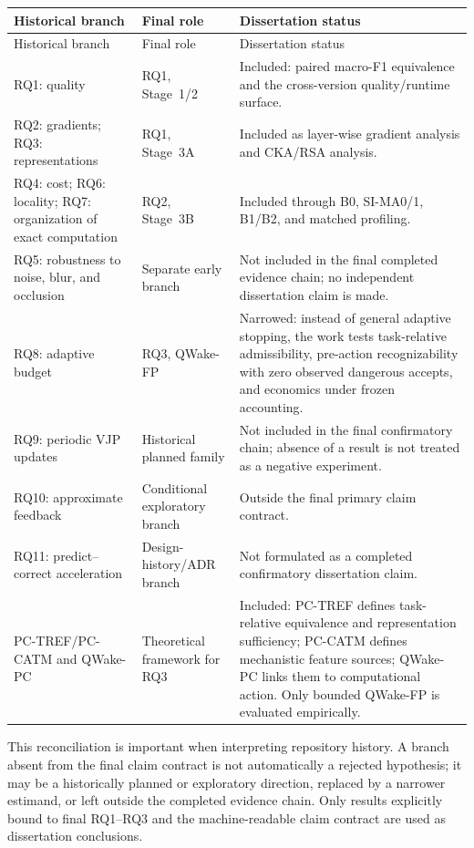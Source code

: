 \begin{longtable}{@{}L{0.19\textwidth}L{0.31\textwidth}L{0.39\textwidth}@{}}
\toprule
Historical branch & Final role & Dissertation status \\
\midrule
\endfirsthead
\toprule
Historical branch & Final role & Dissertation status \\
\midrule
\endhead
RQ1: quality & RQ1, Stage~1/2 & Included: paired macro-F1 equivalence and the cross-version quality/runtime surface. \\
RQ2: gradients; RQ3: representations & RQ1, Stage~3A & Included as layer-wise gradient analysis and CKA/RSA analysis. \\
RQ4: cost; RQ6: locality; RQ7: organization of exact computation & RQ2, Stage~3B & Included through B0, SI-MA0/1, B1/B2, and matched profiling. \\
RQ5: robustness to noise, blur, and occlusion & Separate early branch & Not included in the final completed evidence chain; no independent dissertation claim is made. \\
RQ8: adaptive budget & RQ3, QWake-FP & Narrowed: instead of general adaptive stopping, the work tests task-relative admissibility, pre-action recognizability with zero observed dangerous accepts, and economics under frozen accounting. \\
RQ9: periodic VJP updates & Historical planned family & Not included in the final confirmatory chain; absence of a result is not treated as a negative experiment. \\
RQ10: approximate feedback & Conditional exploratory branch & Outside the final primary claim contract. \\
RQ11: predict--correct acceleration & Design-history/ADR branch & Not formulated as a completed confirmatory dissertation claim. \\
PC-TREF/PC-CATM and QWake-PC & Theoretical framework for RQ3 & Included: PC-TREF defines task-relative equivalence and representation sufficiency; PC-CATM defines mechanistic feature sources; QWake-PC links them to computational action. Only bounded QWake-FP is evaluated empirically. \\
\bottomrule
\end{longtable}

This reconciliation is important when interpreting repository history. A branch absent
from the final claim contract is not automatically a rejected hypothesis; it may be a
historically planned or exploratory direction, replaced by a narrower estimand, or
left outside the completed evidence chain. Only results explicitly bound to final
RQ1--RQ3 and the machine-readable claim contract are used as dissertation conclusions.


